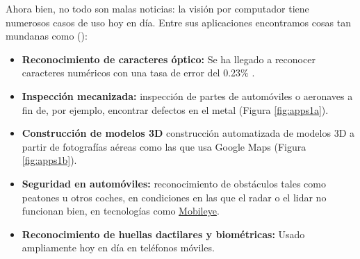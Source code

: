 Ahora bien, no todo son malas noticias: la visión por computador tiene numerosos casos de uso hoy en día. Entre sus aplicaciones encontramos cosas tan mundanas como (\citeauthor*{book:szeliski}):
\begin{itemize}
\item \textbf{Reconocimiento de caracteres óptico:} Se ha llegado a reconocer caracteres numéricos con una tasa de error del 0.23\% \cite{art:2012arXiv1202.2745C}.
\item \textbf{Inspección mecanizada:} inspección de partes de automóviles o aeronaves a fin de, por ejemplo, encontrar defectos en el metal (Figura \ref{fig:apps1a}).
\item \textbf{Construcción de modelos 3D} construcción automatizada de modelos 3D a partir de fotografías aéreas como las que usa Google Maps (Figura \ref{fig:apps1b}).
\item \textbf{Seguridad en automóviles:} reconocimiento de obstáculos tales como peatones u otros coches, en condiciones en las que el radar o el lidar no funcionan bien, en tecnologías como \href{https://www.mobileye.com/}{Mobileye}.
\item \textbf{Reconocimiento de huellas dactilares y biométricas:} Usado ampliamente hoy en día en teléfonos móviles.
\end{itemize}

